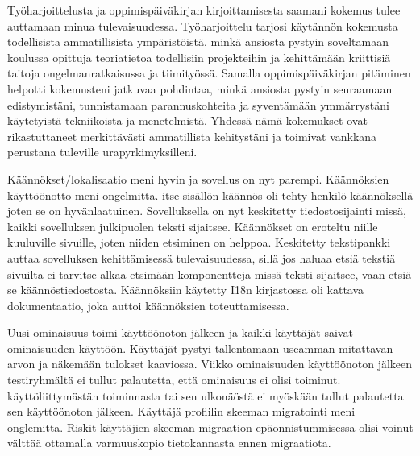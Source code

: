 \documentclass[11pt,a4paper,titlepage,oneside]{article}
\begin{document}
%
Työharjoittelusta ja oppimispäiväkirjan kirjoittamisesta saamani kokemus tulee auttamaan minua tulevaisuudessa.
Työharjoittelu tarjosi käytännön kokemusta todellisista ammatillisista ympäristöistä,
minkä ansiosta pystyin soveltamaan koulussa opittuja teoriatietoa todellisiin projekteihin ja kehittämään kriittisiä taitoja 
ongelmanratkaisussa ja tiimityössä.
Samalla oppimispäiväkirjan pitäminen helpotti kokemusteni jatkuvaa pohdintaa,
minkä ansiosta pystyin seuraamaan edistymistäni,
tunnistamaan parannuskohteita ja syventämään ymmärrystäni käytetyistä tekniikoista ja menetelmistä.
Yhdessä nämä kokemukset ovat rikastuttaneet merkittävästi ammatillista kehitystäni ja toimivat vankkana perustana tuleville urapyrkimyksilleni.
\medskip













\iffalse

Käännökset/lokalisaatio meni hyvin ja sovellus on nyt parempi.
Käännöksien käyttöönotto meni ongelmitta.
itse sisällön käännös oli tehty henkilö käännöksellä joten se on hyvänlaatuinen.
%
Sovelluksella on nyt keskitetty tiedostosijainti missä, kaikki sovelluksen julkipuolen teksti sijaitsee.
Käännökset on eroteltu niille kuuluville sivuille, joten niiden etsiminen on helppoa.
Keskitetty tekstipankki auttaa sovelluksen kehittämisessä tulevaisuudessa,
sillä jos haluaa etsiä tekstiä sivuilta ei tarvitse alkaa etsimään komponentteja missä teksti sijaitsee,
vaan etsiä se käännöstiedostosta.
%
Käännöksiin käytetty I18n kirjastossa oli kattava dokumentaatio, joka auttoi käännöksien toteuttamisessa.
\medskip



Uusi ominaisuus toimi käyttöönoton jälkeen ja kaikki käyttäjät saivat ominaisuuden käyttöön.
Käyttäjät pystyi tallentamaan useamman mitattavan arvon ja näkemään tulokset kaaviossa. %
Viikko ominaisuuden käyttöönoton jälkeen testiryhmältä ei tullut palautetta, että ominaisuus ei olisi toiminut.
%
käyttöliittymästän toiminnasta tai sen ulkonäöstä ei myöskään tullut palautetta sen käyttöönoton jälkeen.
%
Käyttäjä profiilin skeeman migratointi meni onglemitta.
Riskit käyttäjien skeeman migraation epäonnistummisessa olisi voinut välttää ottamalla varmuuskopio tietokannasta ennen migraatiota.
\medskip
\end{document}
